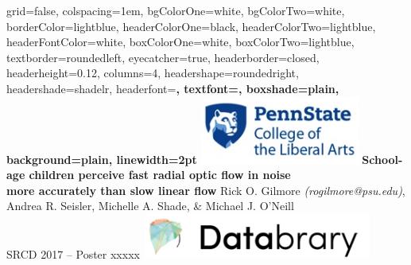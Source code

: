 \documentclass[landscape,final,paperwidth=60in,paperheight=41.5in,fontscale=0.285]{baposter}
\begin{document}



\begin{poster}%
  {
  grid=false,
  colspacing=1em,
  bgColorOne=white,
  bgColorTwo=white,
  borderColor=lightblue,
  headerColorOne=black,
  headerColorTwo=lightblue,
  headerFontColor=white,
  boxColorOne=white,
  boxColorTwo=lightblue,
  textborder=roundedleft,
  eyecatcher=true,
  headerborder=closed,
  headerheight=0.12\textheight,
  columns=4, %
  headershape=roundedright,
  headershade=shadelr,
  headerfont=\Large\bf\textsc, %
  textfont={\setlength{\parindent}{1.5em}},
  boxshade=plain,
  background=plain,
  linewidth=2pt
  }
  {\includegraphics[height=6em]{img/penn_state_cla_logo_new_210-89.jpg}}
  {\bf{School-age children perceive fast radial optic flow in noise\\more accurately than slow linear flow} \vspace{0.2em}}
  {Rick O. Gilmore \emph{(rogilmore@psu.edu)}, Andrea R. Seisler, Michelle A. Shade, \& Michael J. O'Neill\\ \vspace{0.2em}
  SRCD 2017 -- Poster xxxxx}
 {\includegraphics[height=4em]{img/databrary.png}}


\end{poster}
\end{document}
